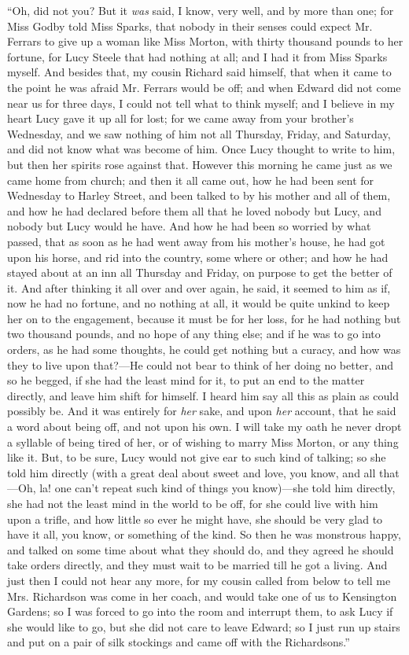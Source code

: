 “Oh, did not you? But it {\em was} said, I know, very well, and by more than one; for Miss Godby told Miss Sparks, that nobody in their senses could expect Mr. Ferrars to give up a woman like Miss Morton, with thirty thousand pounds to her fortune, for Lucy Steele that had nothing at all; and I had it from Miss Sparks myself. And besides that, my cousin Richard said himself, that when it came to the point he was afraid Mr. Ferrars would be off; and when Edward did not come near us for three days, I could not tell what to think myself; and I believe in my heart Lucy gave it up all for lost; for we came away from your brother's Wednesday, and we saw nothing of him not all Thursday, Friday, and Saturday, and did not know what was become of him. Once Lucy thought to write to him, but then her spirits rose against that. However this morning he came just as we came home from church; and then it all came out, how he had been sent for Wednesday to Harley Street, and been talked to by his mother and all of them, and how he had declared before them all that he loved nobody but Lucy, and nobody but Lucy would he have. And how he had been so worried by what passed, that as soon as he had went away from his mother's house, he had got upon his horse, and rid into the country, some where or other; and how he had stayed about at an inn all Thursday and Friday, on purpose to get the better of it. And after thinking it all over and over again, he said, it seemed to him as if, now he had no fortune, and no nothing at all, it would be quite unkind to keep her on to the engagement, because it must be for her loss, for he had nothing but two thousand pounds, and no hope of any thing else; and if he was to go into orders, as he had some thoughts, he could get nothing but a curacy, and how was they to live upon that?---He could not bear to think of her doing no better, and so he begged, if she had the least mind for it, to put an end to the matter directly, and leave him shift for himself. I heard him say all this as plain as could possibly be. And it was entirely for {\em her} sake, and upon {\em her} account, that he said a word about being off, and not upon his own. I will take my oath he never dropt a syllable of being tired of her, or of wishing to marry Miss Morton, or any thing like it. But, to be sure, Lucy would not give ear to such kind of talking; so she told him directly (with a great deal about sweet and love, you know, and all that---Oh, la! one can't repeat such kind of things you know)---she told him directly, she had not the least mind in the world to be off, for she could live with him upon a trifle, and how little so ever he might have, she should be very glad to have it all, you know, or something of the kind. So then he was monstrous happy, and talked on some time about what they should do, and they agreed he should take orders directly, and they must wait to be married till he got a living. And just then I could not hear any more, for my cousin called from below to tell me Mrs. Richardson was come in her coach, and would take one of us to Kensington Gardens; so I was forced to go into the room and interrupt them, to ask Lucy if she would like to go, but she did not care to leave Edward; so I just run up stairs and put on a pair of silk stockings and came off with the Richardsons.”

